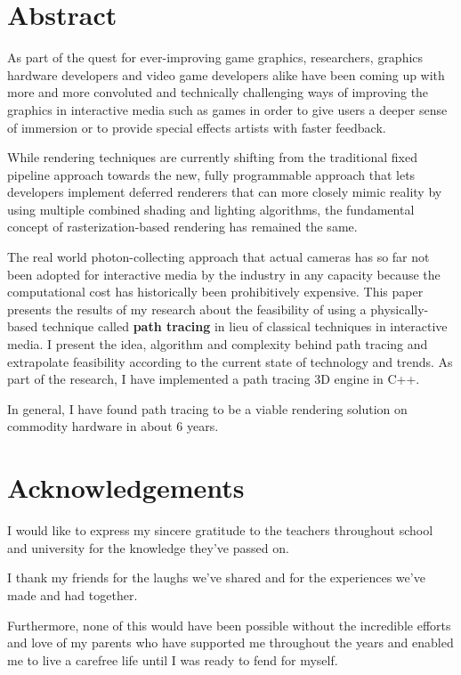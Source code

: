 \documentclass[
  twoside,
  11pt, a4paper,
  footinclude=true,
  headinclude=true,
  cleardoublepage=empty
]{scrreprt}
\begin{document}


\chapter*{Abstract}
\onehalfspace
As part of the quest for ever-improving game graphics, researchers, graphics hardware developers
and video game developers alike have been coming up with more and more convoluted and technically
challenging ways of improving the graphics in interactive media such as games in order to give
users a deeper sense of immersion or to provide special effects artists with faster feedback.

While rendering techniques are currently shifting from the traditional fixed pipeline approach
towards the new, fully programmable approach that lets developers implement deferred renderers that
can more closely mimic reality by using multiple combined shading and lighting algorithms, the
fundamental concept of rasterization-based rendering has remained the same.

The real world photon-collecting approach that actual cameras has so far not been adopted for
interactive media by the industry in any capacity because the computational cost has historically
been prohibitively expensive.
This paper presents the results of my research about the feasibility of using a physically-based
technique called \textbf{path tracing} in lieu of classical techniques in interactive media. I
present the idea, algorithm and complexity behind path tracing and extrapolate feasibility
according to the current state of technology and trends. As part of the research, I have implemented a path tracing 3D engine in C++.

In general, I have found path tracing to be a viable rendering solution on commodity hardware in
about 6 years.
\singlespace

\chapter*{Acknowledgements}
\doublespacing
I would like to express my sincere gratitude to the teachers throughout school and university for
the knowledge they've passed on.

I thank my friends for the laughs we've shared and for the experiences we've made and had together.

Furthermore, none of this would have been possible without the incredible efforts and love of my
parents who have supported me throughout the years and enabled me to live a carefree life until I
was ready to fend for myself.
\end{document}
